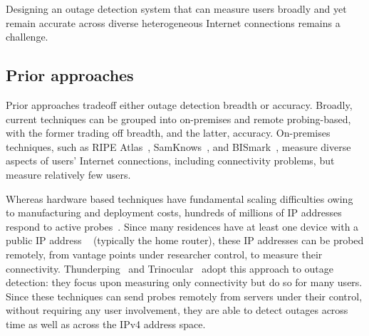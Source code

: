 Designing an outage detection system that can measure users
broadly and yet remain accurate across diverse heterogeneous
Internet connections remains a challenge.

\subsection{Prior approaches}

Prior approaches tradeoff either outage detection breadth or
accuracy. Broadly, current techniques can be grouped into on-premises
and remote probing-based, with the former trading off breadth, and the
latter, accuracy. On-premises techniques, such as RIPE
Atlas~\cite{atlas}, SamKnows~\cite{samknows}, and
BISmark~\cite{bismark-main-bib}, measure diverse aspects of users'
Internet connections, including connectivity problems, but measure
relatively few users.


Whereas hardware based techniques have fundamental scaling
difficulties owing to manufacturing and deployment costs, hundreds of
millions of IP addresses respond to active
probes~\cite{timeouts}. Since many residences have at least one device
with a public IP address ~\cite{cgn-imc16} (typically the home
router), these IP addresses can be probed remotely, from vantage
points under researcher control, to measure their
connectivity. Thunderping~\cite{pingin} and
Trinocular~\cite{trinocular} adopt this approach to outage detection:
they focus upon measuring only connectivity but do so for many
users. Since these techniques can send probes remotely from servers
under their control, without requiring any user involvement, they are
able to detect outages across time as well as across the IPv4 address
space.


